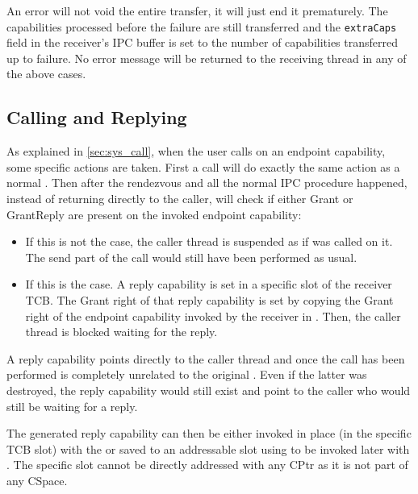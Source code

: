 An error will not void the entire transfer, it will just end it
prematurely. The capabilities processed before the failure are still
transferred and the \texttt{extraCaps} field in the receiver's IPC
buffer is set to the number of capabilities transferred up to failure.
No error message will be returned to the receiving thread in any of the
above cases.

\subsection{Calling and Replying}
\label{sec:ep-cal}

As explained in \autoref{sec:sys_call}, when the user calls
 on an endpoint capability,
some specific actions are taken. First a call will do exactly the same action as
a normal . Then after the rendezvous and all the
normal IPC procedure happened, instead of returning directly to the caller,
 will check if either Grant or GrantReply are
present on the invoked endpoint capability:

\begin{itemize}
\item If this is not the case, the caller thread is suspended as if
   was called on it. The send part of
  the call would still have been performed as usual.
\item If this is the case. A reply capability is set in a specific slot of the
  receiver TCB. The Grant right of that reply capability is set by copying the Grant
  right of the endpoint capability invoked by the receiver in
  .
  Then, the caller thread is blocked waiting for the reply.
  \end{itemize}

A reply capability points directly to the caller thread and once the call has
been performed is completely unrelated to the original . Even if
the latter was destroyed, the reply capability would still exist and point to
the caller who would still be waiting for a reply.

The generated reply capability can then be either invoked in place (in the
specific TCB slot) with the  or saved to an
addressable slot using  to be
invoked later with . The specific slot cannot be
directly addressed with any CPtr as it is not part of any CSpace.

